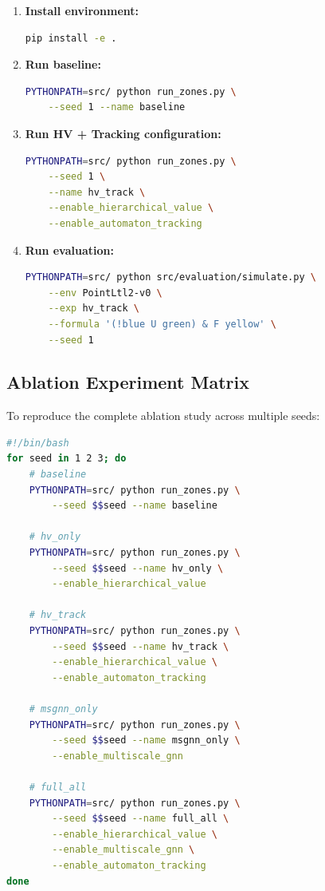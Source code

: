 \documentclass[conference]{IEEEtran}
\begin{document}
\begin{enumerate}
    \item \textbf{Install environment:}
    \begin{lstlisting}[language=bash]
pip install -e .
    \end{lstlisting}
    
    \item \textbf{Run baseline:}
    \begin{lstlisting}[language=bash]
PYTHONPATH=src/ python run_zones.py \
    --seed 1 --name baseline
    \end{lstlisting}
    
    \item \textbf{Run HV + Tracking configuration:}
    \begin{lstlisting}[language=bash]
PYTHONPATH=src/ python run_zones.py \
    --seed 1 \
    --name hv_track \
    --enable_hierarchical_value \
    --enable_automaton_tracking
    \end{lstlisting}
    
    \item \textbf{Run evaluation:}
    \begin{lstlisting}[language=bash]
PYTHONPATH=src/ python src/evaluation/simulate.py \
    --env PointLtl2-v0 \
    --exp hv_track \
    --formula '(!blue U green) & F yellow' \
    --seed 1
    \end{lstlisting}
\end{enumerate}

\subsection{Ablation Experiment Matrix}

To reproduce the complete ablation study across multiple seeds:

\begin{lstlisting}[language=bash]
#!/bin/bash
for seed in 1 2 3; do
    # baseline
    PYTHONPATH=src/ python run_zones.py \
        --seed $$seed --name baseline
    
    # hv_only
    PYTHONPATH=src/ python run_zones.py \
        --seed $$seed --name hv_only \
        --enable_hierarchical_value
    
    # hv_track
    PYTHONPATH=src/ python run_zones.py \
        --seed $$seed --name hv_track \
        --enable_hierarchical_value \
        --enable_automaton_tracking
    
    # msgnn_only
    PYTHONPATH=src/ python run_zones.py \
        --seed $$seed --name msgnn_only \
        --enable_multiscale_gnn
    
    # full_all
    PYTHONPATH=src/ python run_zones.py \
        --seed $$seed --name full_all \
        --enable_hierarchical_value \
        --enable_multiscale_gnn \
        --enable_automaton_tracking
done
\end{lstlisting}
\end{document}
